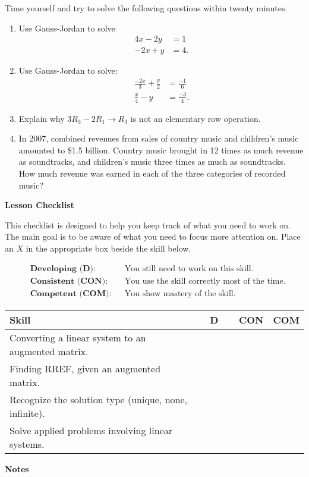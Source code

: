 \documentclass[10pt]{book}
\theoremstyle{definition}
\theoremstyle{remark}
\begin{document}
\begin{large}
\noindent
Time yourself and try to solve the following questions within twenty minutes. 
\begin{enumerate}
\item Use Gauss-Jordan to solve \begin{align*}  4x - 2y &= 1 \\ -2x +y &= 4. \end{align*}\vfil
\item Use Gauss-Jordan to solve: \begin{align*}   \frac{-2x}{3} + \frac{y}{2} &= \frac{-1}{6}\\ \frac{x}{4}- y &= \frac{-3}{4}. \end{align*}\vfil
\item Explain why $3R_{3} - 2R_{1} \rightarrow R_{3}$ is not an elementary row operation.\vfil
\item In 2007, combined revenues from sales of country music and children’s music amounted to \$1.5 billion.  Country music brought in 12 times as much revenue as soundtracks, and children’s music three times as much as soundtracks. How much revenue was earned in each of the three categories of recorded music?\vfil
\end{enumerate}

\noindent
\textbf{Lesson Checklist}
\bigskip

\noindent
This checklist is designed to help you keep track of what you need to work on. The main goal is to be aware of what you need to focus more attention on. Place an $X$ in the appropriate box beside the skill below. 
\bigskip

\noindent
\begin{align*}
&\textbf{Developing (D):} &&\textrm{You still need to work on this skill.}\\
&\textbf{Consistent (CON):} &&\textrm{You use the skill correctly most of the time.}\\
&\textbf{Competent (COM):} &&\textrm{You show mastery of the skill.} 
\end{align*}
\vfil

\begin{center}
\begin{tabular}{|l|l|l|l|}
\hline
\textbf{Skill} & \textbf{~~D~~} & \textbf{CON} & \textbf{COM} \\
\hline
Converting a linear system to an augmented matrix.&&&\\
\hline
Finding RREF, given an augmented matrix.&&&\\
\hline
Recognize the solution type (unique, none, infinite).&&&\\
\hline
Solve applied problems involving linear systems.&&&\\
\hline
\end{tabular}
\end{center}
 \vfil

\noindent
\textbf{Notes}
\end{large} \vfil
\newpage
\end{document}
